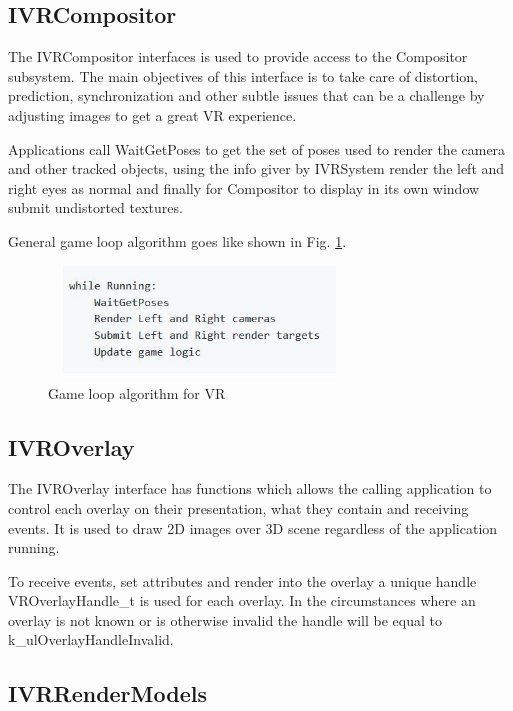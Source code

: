 \documentclass[journal]{IEEEtran}
\begin{document}
\subsection{IVRCompositor}

The IVRCompositor interfaces is used to provide access to the Compositor subsystem. The main objectives of this interface is to take care of distortion, prediction, synchronization and other subtle issues that can be a challenge by adjusting images to get a great VR experience.

Applications call WaitGetPoses to get the set of poses used to render the camera and other tracked objects, using the info giver by IVRSystem render the left and right eyes as normal and finally for Compositor to display in its own window submit undistorted textures.

General game loop algorithm goes like shown in Fig. \ref{fig:ivrcomp}.

\begin{figure}[H]
	\includegraphics[width=8cm, height=3cm]{ivrcompositor} 
	\centering
	\caption{ Game loop algorithm for VR  \cite{openVR_fn_images} \label{fig:ivrcomp}}
\end{figure}

\subsection{IVROverlay}

The IVROverlay interface has functions which allows the calling application to control each overlay on their presentation, what they contain and receiving events. It is used to draw 2D images over 3D scene regardless of the application running.

To receive events, set attributes and render into the overlay a unique handle VROverlayHandle\_t is used for each overlay. In the circumstances where an overlay is not known or is otherwise invalid the handle will be equal to k\_ulOverlayHandleInvalid.

\subsection{IVRRenderModels}
\end{document}
